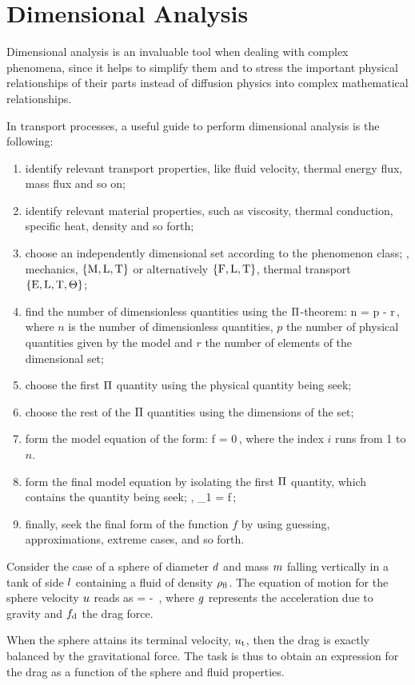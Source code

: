 \section{Dimensional Analysis}
%
Dimensional analysis is an invaluable tool when dealing with complex phenomena, since it helps to simplify them and to stress the important physical relationships of their parts instead of diffusion physics into complex mathematical relationships. 

In transport processes, a useful guide to perform dimensional analysis is the following:
\begin{enumerate}
\item identify relevant transport properties, like fluid velocity, thermal energy flux, mass flux and so on;
\item identify relevant material properties, such as viscosity, thermal conduction, specific heat, density and so forth;
\item choose an independently dimensional set according to the phenomenon class; \ie, mechanics, $\left\lbrace{\text{M}, \text{L}, \text{T}}\right\rbrace$ or alternatively $\left\lbrace{\text{F}, \text{L}, \text{T}}\right\rbrace$, thermal transport $\left\lbrace{\text{E}, \text{L}, \text{T}, \Theta}\right\rbrace$;
\item find the number of dimensionless quantities using the $\Pi$-theorem:
\beq
n = p - r\,,
\eeq
where $n$ is the number of dimensionless quantities, $p$ the number of physical quantities given by the model and $r$ the number of elements of the dimensional set;
\item choose the first $\Pi$ quantity using the physical quantity being seek;
\item choose the rest of the $\Pi$ quantities using the dimensions of the set;
\item form the model equation of the form:
\beq
f = 0\,,
\eeq
where the index $i$ runs from 1 to $n$.
\item form the final model equation by isolating the first $\Pi$ quantity, which contains the quantity being seek; \ie,
\beq
\kdim_1 = f\,;
\eeq
\item finally, seek the final form of the function $f$ by using guessing, approximations, extreme cases, and so forth.
\end{enumerate}

\begin{example}
Consider the case of a sphere of diameter $d$ and mass $m$ falling vertically in a tank of side $l$ containing a fluid of density $\rho_\text{fl}$. The equation of motion for the sphere velocity $u$ reads as
\beq
\mass \dt\vel = \mass\grav - \drag\,,
\eeq
where $g$ represents the acceleration due to gravity and $f_\text{d}$ the drag force. 

When the sphere attains its terminal velocity, $u_\text{t}$, then the drag is exactly balanced by the gravitational force. The task is thus to obtain an expression for the drag as a function of the sphere and fluid properties.
\end{example}

